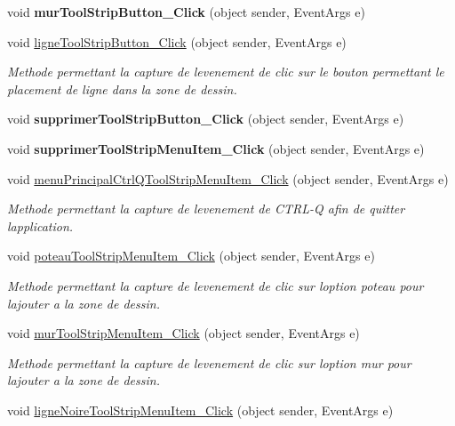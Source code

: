 \begin{DoxyCompactItemize}
void {\bfseries mur\+Tool\+Strip\+Button\+\_\+\+Click} (object sender, Event\+Args e)
\item 
void \hyperlink{group__inf2990_ga5f0cff308c59923d68564b1a18ce578e}{ligne\+Tool\+Strip\+Button\+\_\+\+Click} (object sender, Event\+Args e)
\begin{DoxyCompactList}\small\item\em Methode permettant la capture de l\textquotesingle{}evenement de clic sur le bouton permettant le placement de ligne dans la zone de dessin. \end{DoxyCompactList}\item 
void {\bfseries supprimer\+Tool\+Strip\+Button\+\_\+\+Click} (object sender, Event\+Args e)
\item 
void {\bfseries supprimer\+Tool\+Strip\+Menu\+Item\+\_\+\+Click} (object sender, Event\+Args e)
\item 
void \hyperlink{group__inf2990_gab63ce0aebcd8c675cdb765cb2da8d5bb}{menu\+Principal\+Ctrl\+Q\+Tool\+Strip\+Menu\+Item\+\_\+\+Click} (object sender, Event\+Args e)
\begin{DoxyCompactList}\small\item\em Methode permettant la capture de l\textquotesingle{}evenement de C\+T\+R\+L-\/Q afin de quitter l\textquotesingle{}application. \end{DoxyCompactList}\item 
void \hyperlink{group__inf2990_gaa21ab6759eb89bf87c720ee325d2f7e6}{poteau\+Tool\+Strip\+Menu\+Item\+\_\+\+Click} (object sender, Event\+Args e)
\begin{DoxyCompactList}\small\item\em Methode permettant la capture de l\textquotesingle{}evenement de clic sur l\textquotesingle{}option poteau pour l\textquotesingle{}ajouter a la zone de dessin. \end{DoxyCompactList}\item 
void \hyperlink{group__inf2990_gae70988c8693c5aebd5641b2de6114ea6}{mur\+Tool\+Strip\+Menu\+Item\+\_\+\+Click} (object sender, Event\+Args e)
\begin{DoxyCompactList}\small\item\em Methode permettant la capture de l\textquotesingle{}evenement de clic sur l\textquotesingle{}option mur pour l\textquotesingle{}ajouter a la zone de dessin. \end{DoxyCompactList}\item 
void \hyperlink{group__inf2990_ga433854650d3a79068797a8d5659a7f59}{ligne\+Noire\+Tool\+Strip\+Menu\+Item\+\_\+\+Click} (object sender, Event\+Args e)

\end{DoxyCompactItemize}
